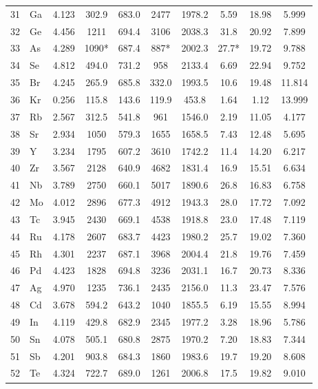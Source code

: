 \documentclass[11pt,a4paper]{article}
\begin{document}
\begin{longtable}{@{}llcccccccc@{}}
		31 & Ga  & 4.123 & 302.9  & 683.0  & 2477   & 1978.2 & 5.59  & 18.98 & 5.999 \\
		32 & Ge  & 4.456 & 1211   & 694.4  & 3106   & 2038.3 & 31.8  & 20.92 & 7.899 \\
		33 & As  & 4.289 & 1090*  & 687.4  & 887*   & 2002.3 & 27.7* & 19.72 & 9.788 \\
		34 & Se  & 4.812 & 494.0  & 731.2  & 958    & 2133.4 & 6.69  & 22.94 & 9.752 \\
		35 & Br  & 4.245 & 265.9  & 685.8  & 332.0  & 1993.5 & 10.6  & 19.48 & 11.814 \\
		36 & Kr  & 0.256 & 115.8  & 143.6  & 119.9  & 453.8  & 1.64  & 1.12  & 13.999 \\
		37 & Rb  & 2.567 & 312.5  & 541.8  & 961    & 1546.0 & 2.19  & 11.05 & 4.177 \\
		38 & Sr  & 2.934 & 1050   & 579.3  & 1655   & 1658.5 & 7.43  & 12.48 & 5.695 \\
		39 & Y   & 3.234 & 1795   & 607.2  & 3610   & 1742.2 & 11.4  & 14.20 & 6.217 \\
		40 & Zr  & 3.567 & 2128   & 640.9  & 4682   & 1831.4 & 16.9  & 15.51 & 6.634 \\
		41 & Nb  & 3.789 & 2750   & 660.1  & 5017   & 1890.6 & 26.8  & 16.83 & 6.758 \\
		42 & Mo  & 4.012 & 2896   & 677.3  & 4912   & 1943.3 & 28.0  & 17.72 & 7.092 \\
		43 & Tc  & 3.945 & 2430   & 669.1  & 4538   & 1918.8 & 23.0  & 17.48 & 7.119 \\
		44 & Ru  & 4.178 & 2607   & 683.7  & 4423   & 1980.2 & 25.7  & 19.02 & 7.360 \\
		45 & Rh  & 4.301 & 2237   & 687.1  & 3968   & 2004.4 & 21.8  & 19.76 & 7.459 \\
		46 & Pd  & 4.423 & 1828   & 694.8  & 3236   & 2031.1 & 16.7  & 20.73 & 8.336 \\
		47 & Ag  & 4.970 & 1235   & 736.1  & 2435   & 2156.0 & 11.3  & 23.47 & 7.576 \\
		48 & Cd  & 3.678 & 594.2  & 643.2  & 1040   & 1855.5 & 6.19  & 15.55 & 8.994 \\
		49 & In  & 4.119 & 429.8  & 682.9  & 2345   & 1977.2 & 3.28  & 18.96 & 5.786 \\
		50 & Sn  & 4.078 & 505.1  & 680.8  & 2875   & 1970.2 & 7.20  & 18.83 & 7.344 \\
		51 & Sb  & 4.201 & 903.8  & 684.3  & 1860   & 1983.6 & 19.7  & 19.20 & 8.608 \\
		52 & Te  & 4.324 & 722.7  & 689.0  & 1261   & 2006.8 & 17.5  & 19.82 & 9.010 \\

\end{longtable}
\end{document}
